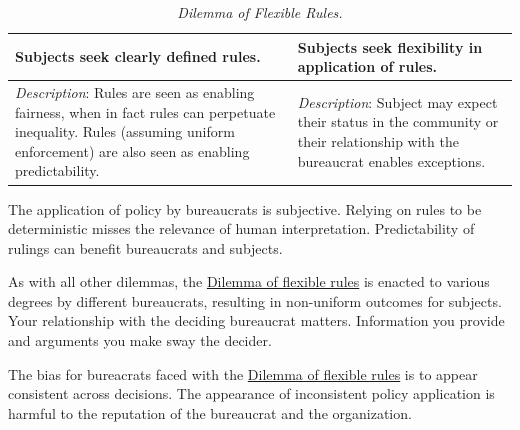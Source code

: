 \begin{center}
\begin{table}[H] %
\begin{tabular}{ | m{\dilemmatablewidth}| m{\dilemmatablewidth} | } 
  \hline
  \textbf{Subjects seek clearly defined rules.} &
  \textbf{Subjects seek flexibility in application of rules.} \\
  \hline
  \textit{Description}: Rules are seen as enabling fairness, when in fact rules can perpetuate inequality. Rules (assuming uniform enforcement) are also seen as enabling predictability. & 
  \textit{Description}: Subject may expect their status in the community or their relationship with the bureaucrat enables exceptions. \\
  \hline
\end{tabular}
\caption{\textit{Dilemma of Flexible Rules.}
}
\label{table:dilemma-flexibility}
\end{table}
\end{center}

The application of policy by bureaucrats is subjective. Relying on rules to be deterministic misses the relevance of human interpretation. Predictability of rulings can benefit bureaucrats and subjects.

As with all other dilemmas, the \hyperref[table:dilemma-flexibility]{Dilemma of flexible rules} is enacted to various degrees by different bureaucrats, resulting in non-uniform outcomes for subjects. Your relationship with the deciding bureaucrat matters. Information you provide and arguments you make sway the decider. 

The bias for bureacrats faced with the \hyperref[table:dilemma-flexibility]{Dilemma of flexible rules} is to appear consistent across decisions. The appearance of inconsistent policy application is harmful to the reputation of the bureaucrat and the organization.

